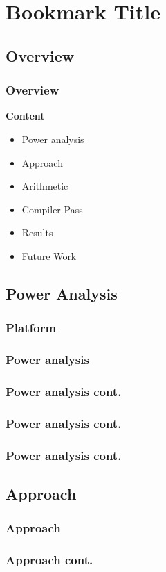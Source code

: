 \documentclass[11pt,t,usepdftitle=false,aspectratio=169]{beamer}
\begin{document}
\section{Bookmark Title}

\subsection{Overview}

\begin{frame}

  \frametitle{Overview}
  \textbf{Content}
  
  \begin{itemize}
  \item Power analysis
  \item Approach
  \item Arithmetic
  \item Compiler Pass
  \item Results
  \item Future Work
  \end{itemize}

\end{frame}

\subsection{Power Analysis}
\begin{frame}
  \frametitle{Platform}
  
\end{frame}

\begin{frame}
  \frametitle{Power analysis}

\end{frame}

\begin{frame}
  \frametitle{Power analysis cont.}

\end{frame}

\begin{frame}
  \frametitle{Power analysis cont.}
\end{frame}
\begin{frame}
  \frametitle{Power analysis cont.}

\end{frame}

\subsection{Approach}
\begin{frame}
  \frametitle{Approach}
\end{frame}
\begin{frame}
  \frametitle{Approach cont.}

\end{frame}
\end{document}
